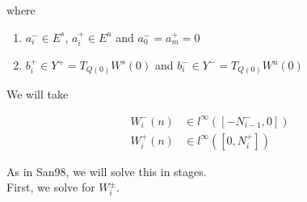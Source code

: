 \documentclass[12pt]{article}
\begin{document}
where 

\begin{enumerate}
\item $a_i^- \in E^s$, $a_i^+ \in E^u$ and $a_0^- = a_m^+ = 0$
\item $b_i^+ \in Y^+ = T_{Q(0)} W^s(0)$ and $b_i^- \in Y^- = T_{Q(0)} W^u(0)$
\end{enumerate}

We will take

\begin{align*}
W_i^-(n) &\in l^\infty([-N_{i-1}^-, 0]) \\
W_i^+(n) &\in l^\infty([0, N_i^+])
\end{align*}

As in San98, we will solve this in stages.\\

First, we solve for $W_i^\pm$.

\end{document}
